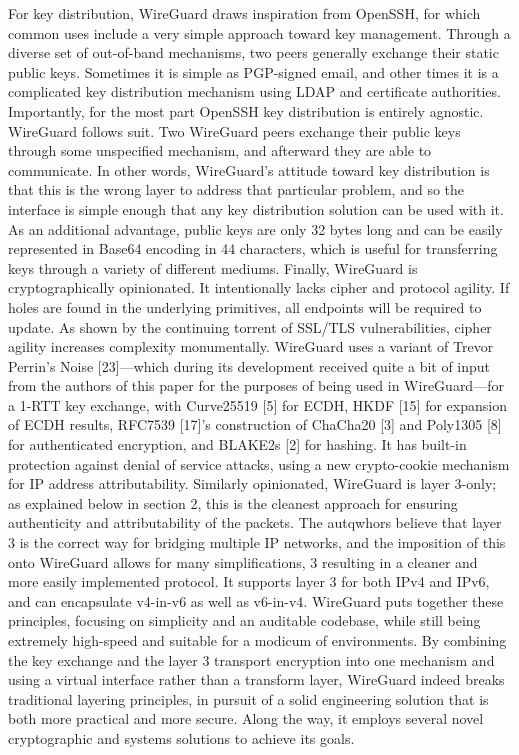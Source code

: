 For key distribution, WireGuard draws inspiration from OpenSSH, for which common uses include a very simple approach toward key management. Through a diverse set of out-of-band mechanisms, two peers generally exchange their static public keys. Sometimes it is simple as PGP-signed email, and other times it is a complicated key distribution mechanism using LDAP and certificate authorities. Importantly, for the most part OpenSSH key distribution is entirely agnostic. WireGuard follows suit. Two WireGuard peers exchange their public keys through some unspecified mechanism, and afterward they are able to communicate. In other words, WireGuard’s attitude toward key distribution is that this is the wrong layer to address that particular problem, and so the interface is simple enough that any key distribution solution can be used with it. As an additional advantage, public keys are only 32 bytes long and can be easily represented in Base64 encoding in 44 characters, which is useful for transferring keys through a variety of different mediums.
Finally, WireGuard is cryptographically opinionated. It intentionally lacks cipher and protocol agility. If holes are found in the underlying primitives, all endpoints will be required to update. As shown by the continuing torrent of SSL/TLS vulnerabilities, cipher agility increases complexity monumentally. WireGuard uses a variant of Trevor Perrin’s Noise [23]—which during its development received quite a bit of input from the authors of this paper for the purposes of being used in WireGuard—for a 1-RTT key exchange, with Curve25519 [5] for ECDH, HKDF [15] for expansion of ECDH results, RFC7539 [17]’s construction of ChaCha20 [3] and Poly1305 [8] for authenticated encryption, and BLAKE2s [2] for hashing. It has built-in protection against denial of service attacks, using a new crypto-cookie mechanism for IP address attributability.
Similarly opinionated, WireGuard is layer 3-only; as explained below in section 2, this is the cleanest approach for ensuring authenticity and attributability of the packets. The autqwhors believe that layer 3 is the correct way for bridging multiple IP networks, and the imposition of this onto WireGuard allows for many simplifications,
3
resulting in a cleaner and more easily implemented protocol. It supports layer 3 for both IPv4 and IPv6, and can encapsulate v4-in-v6 as well as v6-in-v4.
WireGuard puts together these principles, focusing on simplicity and an auditable codebase, while still being extremely high-speed and suitable for a modicum of environments. By combining the key exchange and the layer 3 transport encryption into one mechanism and using a virtual interface rather than a transform layer, WireGuard indeed breaks traditional layering principles, in pursuit of a solid engineering solution that is both more practical and more secure. Along the way, it employs several novel cryptographic and systems solutions to achieve its goals.

